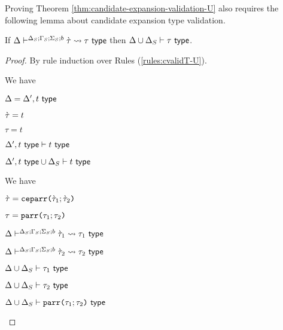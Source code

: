 Proving Theorem \ref{thm:candidate-expansion-validation-U} also requires the following lemma about candidate expansion type validation.
\begin{lemma}\label{lemma:candidate-expansion-type-validation}
If $\Delta\vdash^{\Delta_S; \Gamma_S; \Sigma_S; b} \grave{\tau} \leadsto \tau~\mathsf{type}$ then $\Delta \cup \Delta_S \vdash \tau~\mathsf{type}$.
\end{lemma}
\begin{proof} By rule induction over Rules (\ref{rules:cvalidT-U}).
\begin{byCases}
\item[\text{(\ref{rule:cvalidT-U-tvar})}] We have 
\begin{pfsteps*}
   \item $\Delta=\Delta', t~\mathsf{type}$ 
   \item $\grave{\tau}=t$ 
   \item $\tau=t$ 
   \item $\Delta', t~\mathsf{type} \vdash t~\mathsf{type}$  
   \item $\Delta', t~\mathsf{type} \cup \Delta_S \vdash t~\mathsf{type}$ 
 \end{pfsteps*} 
\resetpfcounter

\item[\text{(\ref{rule:cvalidT-U-parr})}] We have
\begin{pfsteps*}
  \item $\grave{\tau}=\texttt{ceparr}\texttt{(}\grave{\tau}_1; \grave{\tau}_2\texttt{)}$ 
  \item $\tau=\texttt{parr}\texttt{(}\tau_1; \tau_2\texttt{)}$ 
  \item $\Delta\vdash^{\Delta_S; \Gamma_S; \Sigma_S; b} \grave{\tau}_1 \leadsto \tau_1~\mathsf{type}$  
  \item $\Delta\vdash^{\Delta_S; \Gamma_S; \Sigma_S; b} \grave{\tau}_2 \leadsto \tau_2~\mathsf{type}$  
  \item $\Delta \cup \Delta_S \vdash \tau_1~\mathsf{type}$  
  \item $\Delta \cup \Delta_S \vdash \tau_2~\mathsf{type}$  
  \item $\Delta \cup \Delta_S \vdash \texttt{parr}\texttt{(}\tau_1; \tau_2\texttt{)}~\mathsf{type}$ 
\end{pfsteps*}
\resetpfcounter


\end{byCases}
\end{proof}
